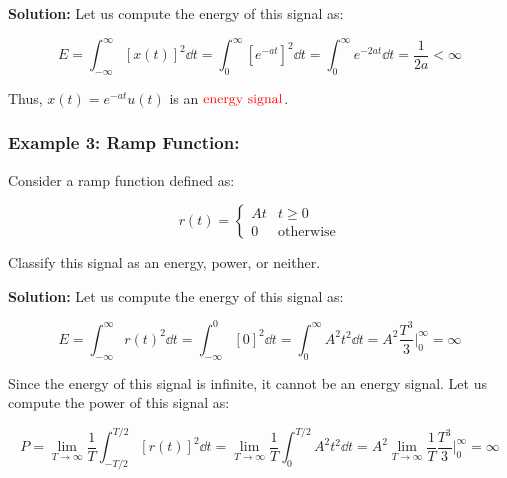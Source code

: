 \documentclass[
  12pt,
  a4paper,
]{report}
\begin{document}
\textbf{Solution:} Let us compute the energy of this signal as:

\begin{equation}     
\label{eq:exp-function-energy}     
E = \int_{-\infty}^{\infty} {[x(t)]}^2  \dd{t} = \int_{0}^{\infty} {[e^{-at}]}^2 \dd{t} = \int_{0}^{\infty} e^{-2at} \dd{t} = \frac{1}{2a} < \infty 
\end{equation}

Thus, \(x(t) = e^{-at} u(t)\) is an
\(\textcolor{red}{\text{energy signal}}\).

\subsubsection{Example 3: Ramp Function:}\label{example-3-ramp-function}

Consider a ramp function defined as:

\begin{equation}     
\label{eq:ramp-function-example}     
r(t) = 
    \begin{cases}         
        At & t \geq 0         \\         
        0  & \text{otherwise}     
    \end{cases} 
\end{equation}

Classify this signal as an energy, power, or neither.

\textbf{Solution:} Let us compute the energy of this signal as:

\begin{equation}     
\label{eq:ramp-function-energy}     
E = \int_{-\infty}^{\infty} {r(t)}^2 \dd{t} = \int_{-\infty}^{0} {[0]}^2 \dd{t} = \int_{0}^{\infty} A^2 t^2 \dd{t} = A^2 \frac{T^3}{3} \Bigg|_{0}^{\infty} = \infty 
\end{equation}

Since the energy of this signal is infinite, it cannot be an energy
signal. Let us compute the power of this signal as:

\begin{equation}     
\label{eq:ramp-function-power}     
P = \lim_{T \to \infty} \frac{1}{T} \int_{-T/2}^{T/2} {[r(t)]}^2 \dd{t} = \lim_{T \to \infty} \frac{1}{T} \int_{0}^{T/2} A^2 t^2 \dd{t} = A^2 \lim_{T \to \infty} \frac{1}{T} \frac{T^3}{3} \Bigg|_{0}^{\infty} = \infty 
\end{equation} 
\end{document}
